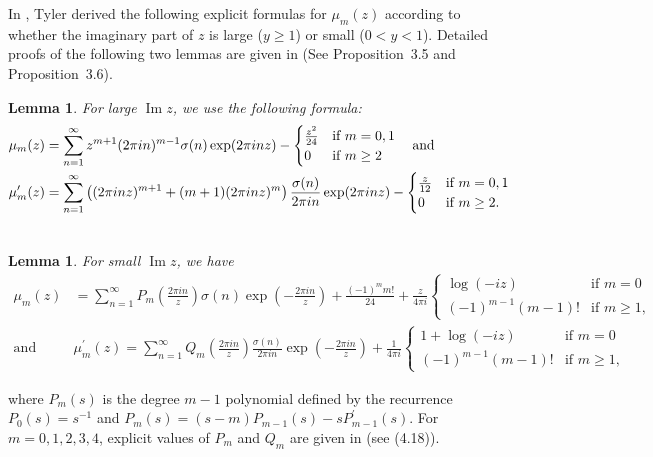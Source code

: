 \documentclass[11pt]{amsart}
\theoremstyle{plain}
\newtheorem{lemma}[theorem]{Lemma}
\renewcommand{\Im}{\operatorname{Im}}
\numberwithin{equation}{section}
\begin{document}
	In \cite{tyler2026asymptotics}, Tyler derived the following explicit formulas for $\mu_m(z)$ according to whether the imaginary part of $z$ is large ($y\ge 1$) or small ($0<y<1$). Detailed proofs of the following two lemmas are given in \cite{barman2026asymptotic}(See Proposition~3.5 and Proposition~3.6).
	\begin{lemma}\label{eq-(2.1)}
		For large $\Im z$, we use the following formula:
		\begin{align*}
			\notag
			\mu_{m}(z)&=\sum_{n=1}^{\infty}z^{m+1}(2\pi in)^{m-1}\sigma(n)\exp(2\pi inz)- \begin{cases} 
				\frac{z^{2}}{24} & \mbox{if } m=0,1 \\ 
				0 & \mbox{if } m\ge 2 
			\end{cases} \quad\text{and}\\  
			\mu_{m}^{\prime}(z)&=\sum_{n=1}^{\infty}\left((2\pi inz)^{m+1}+(m+1)(2\pi inz)^{m}\right) \frac{\sigma(n)}{2\pi in}\exp(2\pi inz)-\begin{cases} 
				\frac{z}{12} & \mbox{if } m=0,1 \\ 
				0 & \mbox{if } m\ge 2. 
			\end{cases}\\ 
			\notag   
		\end{align*}
	\end{lemma}
	\begin{lemma}\label{eq-mue}
		For small $\Im z$, we have
		\begin{align*}
			\mu_{m}(z)&=\sum_{n=1}^{\infty}P_{m}\left(\frac{2\pi in}{z}\right)\sigma(n)\exp\left(-\frac{2\pi in}{z}\right)+\frac{(-1)^{m}m!}{24}+\frac{z}{4\pi i}\begin{cases} 
				\log(-iz) & \mbox{if } m=0 \\ 
				(-1)^{m-1}(m-1)! & \mbox{if } m\ge 1, 
			\end{cases} \\
			\text{and}\quad &\mu_{m}^{\prime}(z)=\sum_{n=1}^{\infty}Q_{m}\left(\frac{2\pi in}{z}\right)\frac{\sigma(n)}{2\pi in}\exp\left(-\frac{2\pi in}{z}\right)+\frac{1}{4\pi i}\begin{cases} 
				1+\log (-iz) & \mbox{if } m=0 \\ 
				(-1)^{m-1}(m-1)! & \mbox{if } m\ge 1, 
			\end{cases}  
		\end{align*}
	\end{lemma}
	where $P_{m}(s)$ is the degree $m-1$ polynomial defined by the recurrence $P_{0}(s)=s^{-1}$ and
	$P_{m}(s)=(s-m)P_{m-1}(s)-sP^{\prime}_{m-1}(s)$.  For $m=0,1,2,3,4$, explicit values of $P_m$ and $Q_m$ are given in \cite{tyler2026asymptotics} (see (4.18)). 
\end{document}
